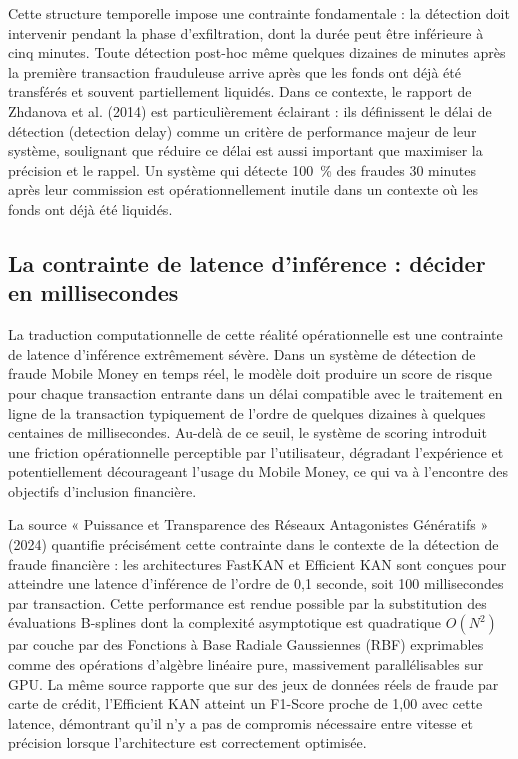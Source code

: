 \documentclass[11pt,a4paper,oneside]{report}
\theoremstyle{definition}
\theoremstyle{remark}
\begin{document}
Cette structure temporelle impose une contrainte fondamentale : la détection doit intervenir pendant la phase d'exfiltration, dont la durée peut être inférieure à cinq minutes. Toute détection post-hoc  même quelques dizaines de minutes après la première transaction frauduleuse  arrive après que les fonds ont déjà été transférés et souvent partiellement liquidés. Dans ce contexte, le rapport de Zhdanova et al. (2014) est particulièrement éclairant : ils définissent le délai de détection (detection delay) comme un critère de performance majeur de leur système, soulignant que réduire ce délai est aussi important que maximiser la précision et le rappel. Un système qui détecte 100~\% des fraudes 30 minutes après leur commission est opérationnellement inutile dans un contexte où les fonds ont déjà été liquidés.

\subsection{La contrainte de latence d'inférence : décider en millisecondes}

La traduction computationnelle de cette réalité opérationnelle est une contrainte de latence d'inférence extrêmement sévère. Dans un système de détection de fraude Mobile Money en temps réel, le modèle doit produire un score de risque pour chaque transaction entrante dans un délai compatible avec le traitement en ligne de la transaction  typiquement de l'ordre de quelques dizaines à quelques centaines de millisecondes. Au-delà de ce seuil, le système de scoring introduit une friction opérationnelle perceptible par l'utilisateur, dégradant l'expérience et potentiellement décourageant l'usage du Mobile Money, ce qui va à l'encontre des objectifs d'inclusion financière.

La source « Puissance et Transparence des Réseaux Antagonistes Génératifs » (2024) quantifie précisément cette contrainte dans le contexte de la détection de fraude financière : les architectures FastKAN et Efficient KAN sont conçues pour atteindre une latence d'inférence de l'ordre de 0,1 seconde, soit 100 millisecondes par transaction. Cette performance est rendue possible par la substitution des évaluations B-splines  dont la complexité asymptotique est quadratique $O(N^2)$ par couche  par des Fonctions à Base Radiale Gaussiennes (RBF) exprimables comme des opérations d'algèbre linéaire pure, massivement parallélisables sur GPU. La même source rapporte que sur des jeux de données réels de fraude par carte de crédit, l'Efficient KAN atteint un F1-Score proche de 1,00 avec cette latence, démontrant qu'il n'y a pas de compromis nécessaire entre vitesse et précision lorsque l'architecture est correctement optimisée.
\end{document}
